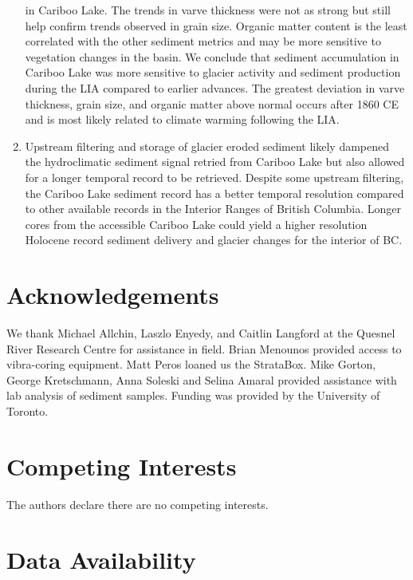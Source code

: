\documentclass[
  letterpaper,
  DIV=11,
  numbers=noendperiod]{scrartcl}
\begin{document}
\begin{enumerate}
  in Cariboo Lake. The trends in varve thickness were not as strong but
  still help confirm trends observed in grain size. Organic matter
  content is the least correlated with the other sediment metrics and
  may be more sensitive to vegetation changes in the basin. We conclude
  that sediment accumulation in Cariboo Lake was more sensitive to
  glacier activity and sediment production during the LIA compared to
  earlier advances. The greatest deviation in varve thickness, grain
  size, and organic matter above normal occurs after 1860 CE and is most
  likely related to climate warming following the LIA.
\item
  Upstream filtering and storage of glacier eroded sediment likely
  dampened the hydroclimatic sediment signal retried from Cariboo Lake
  but also allowed for a longer temporal record to be retrieved. Despite
  some upstream filtering, the Cariboo Lake sediment record has a better
  temporal resolution compared to other available records in the
  Interior Ranges of British Columbia. Longer cores from the accessible
  Cariboo Lake could yield a higher resolution Holocene record sediment
  delivery and glacier changes for the interior of BC.
\end{enumerate}

\pagebreak

\hypertarget{acknowledgements}{%
\section{Acknowledgements}\label{acknowledgements}}

We thank Michael Allchin, Laszlo Enyedy, and Caitlin Langford at the
Quesnel River Research Centre for assistance in field. Brian Menounos
provided access to vibra-coring equipment. Matt Peros loaned us the
StrataBox. Mike Gorton, George Kretschmann, Anna Soleski and Selina
Amaral provided assistance with lab analysis of sediment samples.
Funding was provided by the University of Toronto.

\hypertarget{competing-interests}{%
\section{Competing Interests}\label{competing-interests}}

The authors declare there are no competing interests.

\hypertarget{data-availability}{%
\section{Data Availability}\label{data-availability}}
\end{document}
